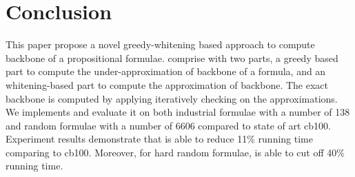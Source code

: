\section{Conclusion}\label{sec:conc}
This paper propose a novel greedy-whitening based approach \tool to compute backbone of a propositional formulae. 
\tool comprise with two parts, a greedy based part to compute the under-approximation of backbone of a formula, and an whitening-based part to compute the approximation of backbone. The exact backbone is computed by applying iteratively checking on the approximations. We implements \tool and evaluate it on both industrial formulae with a number of 138 and random formulae with a number of 6606 compared to state of art cb100. Experiment results demonstrate that \tool is able to reduce 11\% running time comparing to cb100. Moreover, for hard random formulae, \tool is able to cut off 40\% running time.



\newpage
